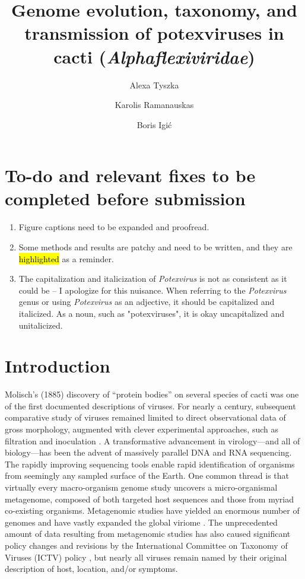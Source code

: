 \documentclass[fleqn,10pt,lineno]{wlpeerj}
\title{Genome evolution, taxonomy, and transmission of potexviruses in cacti (\textit{Alphaflexiviridae})}
\author[1,$\dagger$]{Alexa Tyszka}
\author[1]{Karolis Ramanauskas}
\author[1]{Boris Igi\'c}
\affil[1]{Department of Biological Sciences, University of Illinois at Chicago, 840 West Taylor St.\ MC067, Chicago, IL 60607, United States of America}
\affil[$\dagger$]{Author for correspondence.}
\begin{document}
%
\flushbottom
\maketitle
\thispagestyle{empty}


\section*{To-do and relevant fixes to be completed before submission}
\begin{enumerate}
\item Figure captions need to be expanded and proofread.
\item Some methods and results are patchy and need to be written, and they are \hl{highlighted} as a reminder. 
\item The capitalization and italicization of \textit{Potexvirus} is not as consistent as it could be -- I apologize for this nuisance. When referring to the \textit{Potexvirus} genus or using \textit{Potexvirus} as an adjective, it should be capitalized and italicized. As a noun, such as "potexviruses", it is okay uncapitalized and unitalicized.
\end{enumerate}


\section*{Introduction}

Molisch's (1885) \nocite{molisch1885} discovery of ``protein bodies'' on several species of cacti was one of the first documented descriptions of viruses.
For nearly a century, subsequent comparative study of viruses remained limited to direct observational data of gross morphology, augmented with clever experimental approaches, such as filtration and inoculation \citep{mettenleiter2017}.
A transformative advancement in virology---and all of biology---has been the advent of massively parallel DNA and RNA sequencing. 
The rapidly improving sequencing tools enable rapid identification of organisms from seemingly any sampled surface of the Earth.
One common thread is that virtually every macro-organism genome study uncovers a micro-organismal metagenome, composed of both targeted host sequences and those from myriad co-existing organisms. 
Metagenomic studies have yielded an enormous number of genomes and have vastly expanded the global viriome \citep{gregory_marine_2019,lefeuvre2019,shi_redefining_2016}. 
The unprecedented amount of data resulting from metagenomic studies has also caused significant policy changes and revisions by the International Committee on Taxonomy of Viruses (ICTV) policy \citep{ictv2020,simmonds2017virus}, but nearly all viruses remain named by their original description of host, location, and/or symptoms.
\end{document}
